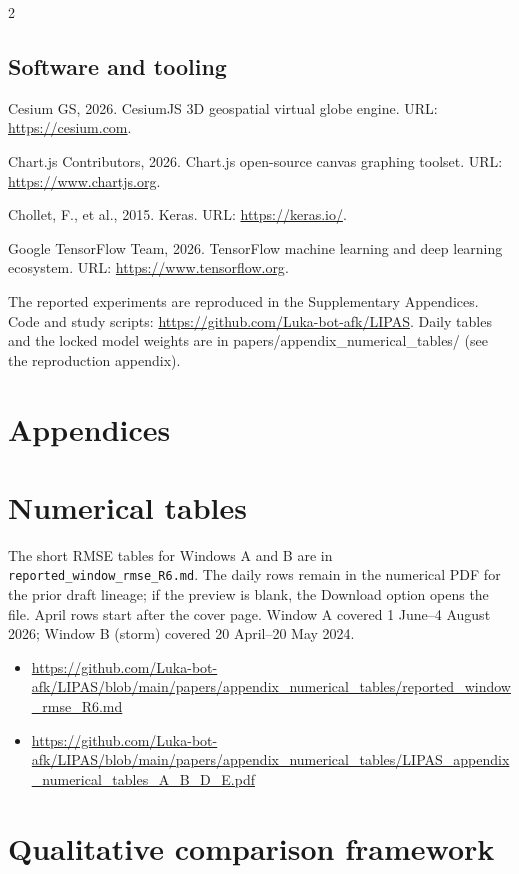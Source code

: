 \begin{multicols}{2}
\subsection*{Software and tooling}
Cesium GS, 2026. CesiumJS 3D geospatial virtual globe engine. URL: \url{https://cesium.com}.

Chart.js Contributors, 2026. Chart.js open-source canvas graphing toolset. URL: \url{https://www.chartjs.org}.

Chollet, F., et al., 2015. Keras. URL: \url{https://keras.io/}.

Google TensorFlow Team, 2026. TensorFlow machine learning and deep learning ecosystem. URL: \url{https://www.tensorflow.org}.

The reported experiments are reproduced in the Supplementary Appendices. Code and study scripts: \url{https://github.com/Luka-bot-afk/LIPAS}. Daily tables and the locked model weights are in papers/appendix\_numerical\_tables/ (see the reproduction appendix).
\end{multicols}
\FloatBarrier
\appendix
\section*{Appendices}
\section{Numerical tables}

The short RMSE tables for Windows A and B are in \texttt{reported\_window\_rmse\_R6.md}. The daily rows remain in the numerical PDF for the prior draft lineage; if the preview is blank, the Download option opens the file. April rows start after the cover page. Window A covered 1 June--4 August 2026; Window B (storm) covered 20 April--20 May 2024.

\begin{itemize}
\item \url{https://github.com/Luka-bot-afk/LIPAS/blob/main/papers/appendix_numerical_tables/reported_window_rmse_R6.md}
\item \url{https://github.com/Luka-bot-afk/LIPAS/blob/main/papers/appendix_numerical_tables/LIPAS_appendix_numerical_tables_A_B_D_E.pdf}
\end{itemize}

\section{Qualitative comparison framework}

